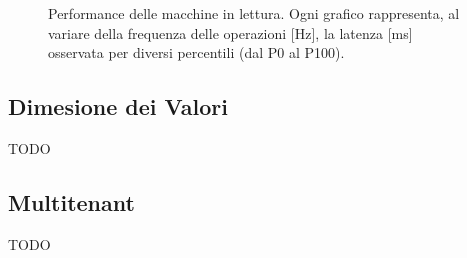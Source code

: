 \begin{figure}[htbp]
    \caption{Performance delle macchine in lettura. Ogni grafico rappresenta, al variare della frequenza delle operazioni [Hz], la latenza [ms] osservata per diversi percentili (dal P0 al P100).}
    \label{fig:bench-get}
\end{figure}

\subsection{Dimesione dei Valori}
\label{subsec:risultati-dimensione}

TODO

\subsection{Multitenant}
\label{subsec:risultati-multitenant}

TODO
